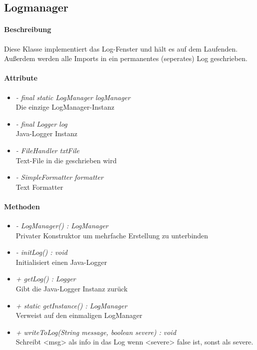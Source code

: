 \subsection{Logmanager}

\paragraph{Beschreibung}
Diese Klasse implementiert das Log-Fenster und hält es auf dem Laufenden.
Außerdem werden alle Imports in ein permanentes (seperates) Log geschrieben.


\paragraph{Attribute}

\begin{itemize}
	
\item \textit{- final static LogManager logManager}  
\\ Die einzige LogManager-Instanz 
\item \textit{- final Logger log}
\\ Java-Logger Instanz
\item \textit{- FileHandler txtFile}
\\ Text-File in die geschrieben wird
\item \textit{-  SimpleFormatter formatter}
\\ Text Formatter

\end{itemize}

\paragraph{Methoden}

\begin{itemize}
	
\item \textit{ - LogManager() : LogManager}  \\ Privater Konstruktor um mehrfache Erstellung zu unterbinden
\item \textit{ - initLog() : void} \\ Initialisiert einen Java-Logger
\item \textit{ + getLog() : Logger} \\ Gibt die Java-Logger Instanz zurück
\item \textit{ + static getInstance() : LogManager}  \\ Verweist auf den einmaligen LogManager
\item \textit{ + writeToLog(String message, boolean severe) : void} \\ Schreibt <msg> als info in das Log wenn <severe> false ist,
sonst als severe.
	
\end{itemize}
